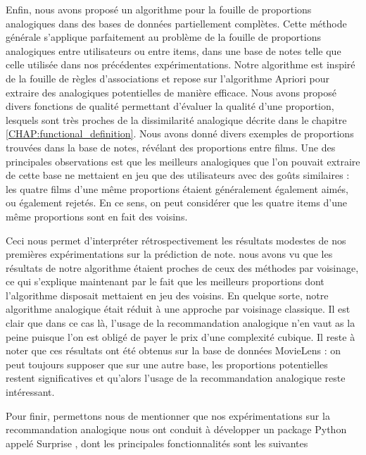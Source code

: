 Enfin, nous avons proposé un algorithme pour la fouille de proportions
analogiques dans des bases de données partiellement complètes. Cette méthode
générale s'applique parfaitement au problème de la fouille de proportions
analogiques entre utilisateurs ou entre items, dans une base de notes telle que
celle utilisée dans nos précédentes expérimentations. Notre algorithme est
inspiré de la fouille de règles d'associations et repose sur l'algorithme
Apriori pour extraire des analogiques potentielles de manière efficace. Nous
avons proposé divers fonctions de qualité permettant d'évaluer la qualité d'une
proportion, lesquels sont très proches de la dissimilarité analogique décrite
dans le chapitre \ref{CHAP:functional_definition}. Nous avons donné divers
exemples de proportions trouvées dans la base de notes, révélant des
proportions entre films. Une des principales observations est que les meilleurs
analogiques que l'on pouvait extraire de cette base ne mettaient en jeu que des
utilisateurs avec des goûts similaires : les quatre films d'une même
proportions étaient généralement également aimés, ou également rejetés. En ce
sens, on peut considérer que les quatre items d'une même proportions sont en
fait des voisins.

Ceci nous permet d'interpréter rétrospectivement les résultats modestes de nos
premières expérimentations sur la prédiction de note. nous avons vu que les
résultats de notre algorithme étaient proches de ceux des méthodes par
voisinage, ce qui s'explique maintenant par le fait que les meilleurs
proportions dont l'algorithme disposait mettaient en jeu des voisins. En
quelque sorte, notre algorithme analogique était réduit à une approche par
voisinage classique. Il est clair que dans ce cas là, l'usage de la
recommandation analogique n'en vaut as la peine puisque l'on est obligé de
payer le prix d'une complexité cubique. Il reste à noter que ces résultats ont
été obtenus sur la base de données MovieLens : on peut toujours supposer que
sur une autre base, les proportions potentielles restent significatives et
qu'alors l'usage de la recommandation analogique reste intéressant.

Pour finir, permettons nous de mentionner que nos expérimentations sur la
recommandation analogique nous ont conduit à développer un package Python
appelé Surprise \cite{Surprise}, dont les principales fonctionnalités sont les
suivantes

